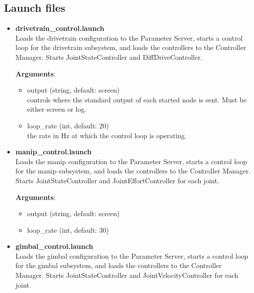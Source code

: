 \documentclass[english,inz,shortabstract]{iithesis}
\newcommand{\val}[1]{\textbf{\textsf{#1}}}
\begin{document}
	\subsection{Launch files}

		\begin{itemize}
			\item \val{drivetrain\_control.launch}\\
			Loads the drivetrain configuration to the Parameter Server, starts a control loop for the drivetrain subsystem, and loads the controllers to the Controller Manager. Starts \textsf{JointStateController} and \textsf{DiffDriveController}.

			\textbf{Arguments}:
			\begin{itemize}[itemsep=0pt, parsep=2pt, topsep=0pt]
				\item \textsf{output} (\textsf{string}, default: \textsf{screen})\\
				controls where the standard output of each started node is sent. Must be either \textsf{screen} or \textsf{log}.
				\item \textsf{loop\_rate} (\textsf{int}, default: \textsf{20})\\
				the rate in Hz at which the control loop is operating.
			\end{itemize}

			\item \val{manip\_control.launch}\\
			Loads the manip configuration to the Parameter Server, starts a control loop for the manip subsystem, and loads the controllers to the Controller Manager. Starts \textsf{JointStateController} and \textsf{JointEffortController} for each joint.

			\textbf{Arguments}:
			\begin{itemize}[itemsep=0pt, parsep=2pt, topsep=0pt]
				\item \textsf{output} (\textsf{string}, default: \textsf{screen})
				\item \textsf{loop\_rate} (\textsf{int}, default: \textsf{30})
			\end{itemize}

			\item \val{gimbal\_control.launch}\\
			Loads the gimbal configuration to the Parameter Server, starts a control loop for the gimbal subsystem, and loads the controllers to the Controller Manager. Starts \textsf{JointStateController} and \textsf{JointVelocityController} for each joint.


\end{itemize}
\end{document}
